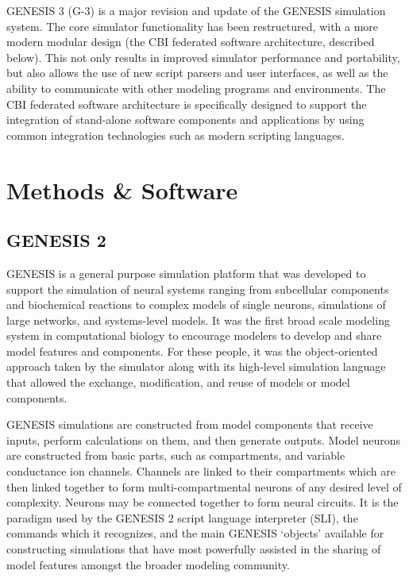 \documentclass[12pt]{article}
\begin{document}
GENESIS 3 (G-3) is a major revision and update of the GENESIS
simulation system.  The core simulator functionality has been
restructured, with a more modern modular design (the CBI federated
software architecture, described below).  This not only results in
improved simulator performance and portability, but also allows the
use of new script parsers and user interfaces, as well as the ability
to communicate with other modeling programs and environments.  The CBI
federated software architecture is specifically designed to support
the integration of stand-alone software components and applications by
using common integration technologies such as modern scripting
languages.


\section{Methods \& Software}

\subsection{GENESIS 2}
\label{sec:genesis}
GENESIS is a general purpose simulation
platform that was developed to support the simulation of neural
systems ranging from subcellular components and biochemical reactions
to complex models of single neurons, simulations of large networks,
and systems-level models. It was the first broad scale modeling system
in computational biology to encourage modelers to develop and share
model features and components. For these people, it was the
object-oriented approach taken by the simulator along with its
high-level simulation language that allowed the exchange,
modification, and reuse of models or model
components. 

GENESIS simulations are constructed from model components that receive
inputs, perform calculations on them, and then generate outputs. Model
neurons are constructed from basic parts, such as compartments, and
variable conductance ion channels. Channels are linked to their
compartments which are then linked together to form
multi-compartmental neurons of any desired level of complexity.
Neurons may be connected together to form neural circuits.  It is the
paradigm used by the GENESIS 2 script language interpreter (SLI), the
commands which it recognizes, and the main GENESIS `objects' available
for constructing simulations that have most powerfully assisted in the
sharing of model features amongst the broader modeling community.
\end{document}
